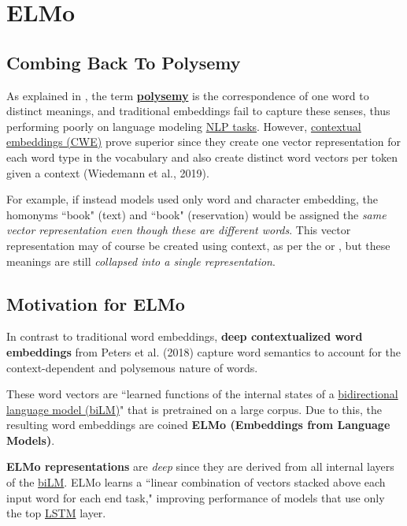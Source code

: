 \section{ELMo} \label{sec:ELMo}


\subsection{Combing Back To Polysemy} \label{sec:PolysemyAgainInElmo} 

As explained in , the term \textbf{\hyperref[sec:Polysemy]{polysemy}} is the correspondence of one word to distinct meanings, and traditional embeddings fail to capture these senses, thus performing poorly on language modeling \hyperref[app:Appendix_NLPTasks]{NLP tasks}. However, \hyperref[sec:SolutionWithContextEmbs]{contextual embeddings (CWE)} prove superior since they create one vector representation for each word type in the vocabulary and also create distinct word vectors per token given a context (Wiedemann et al., 2019). \newline 

For example, if instead models used only word and character embedding, the homonyms ``book" (text) and ``book" (reservation) would be assigned the \emph{same vector representation even though these are different words}. This vector representation may of course be created using context, as per the  or , but these meanings are still \emph{collapsed into a single representation}.


\subsection{Motivation for ELMo} 


In contrast to traditional word embeddings, \textbf{deep contextualized word embeddings} from Peters et al. (2018) capture word semantics to account for the context-dependent and polysemous nature of words. \newline

These word vectors are ``learned functions of the internal states of a \hyperref[sec:BidirectionalLM]{bidirectional language model (biLM)}" that is pretrained on a large corpus. Due to this, the resulting word embeddings are coined \textbf{ELMo (Embeddings from Language Models)}. \newline

\textbf{ELMo representations} are \emph{deep} since they are derived from all internal layers of the \hyperref[sec:BidirectionalLM]{biLM}. ELMo learns a ``linear combination of vectors stacked above each input word for each end task," improving performance of models that use only the top \hyperref[sec:LSTM]{LSTM} layer. \newline

